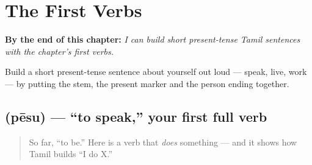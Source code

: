 
\chapter{The First Verbs}
\label{ch:first-verbs}

\begin{chapteropening}
\textbf{By the end of this chapter:} \emph{I can build short present-tense Tamil sentences with the chapter's first verbs.}

Build a short present-tense sentence about yourself out loud — speak, live, work — by putting the stem, the present marker and the person ending together.
\end{chapteropening}

\section[\texorpdfstring{\ta{பேசு} (pēsu)}{பேசு (pēsu)}]{ (pēsu) — \textquotedblleft{}to speak,\textquotedblright{} your first full verb}

\label{lesson:TA-C05-pesu}



\begin{quote}
So far, \textquotedblleft{}to be.\textquotedblright{} Here is a verb that \emph{does} something — and it shows how Tamil builds \textquotedblleft{}I do X.\textquotedblright{}
\end{quote}

